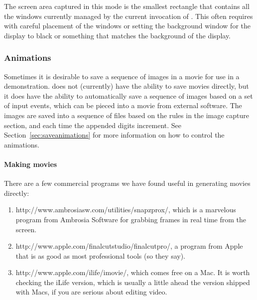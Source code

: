 The screen area captured in this mode is the smallest rectangle that
contains all the windows currently managed by the current invocation of
\map{}.  This often requires with careful placement of the windows or
setting the background window for the display to black or something that
matches the background of the \map{} display.


\subsubsection{Animations}
\label{sec:animation}

Sometimes it is desirable to save a sequence of images in a movie for use
in a demonstration.  \map{} does not (currently) have the ability to save
movies directly, but it does have the ability to automatically save a
sequence of images based on a set of input events, which can be pieced into
a movie from external software.  The images
are saved into a sequence of files based on the rules in the image capture
section, and each time the appended digits increment.  See
Section~\ref{sec:saveanimations} for more information on how to control the
animations.

\paragraph{Making movies}

There are a few commercial programs we have found useful in 
generating movies directly:
\begin{enumerate}
  \item {}
    {http://www.ambrosiasw.com/utilities/snapzprox/}, which is a marvelous
    program from Ambrosia Software for grabbing frames in real time from
    the screen.
  \item {}
    {http://www.apple.com/finalcutstudio/finalcutpro/}, a program from
    Apple that is as good as most professional tools (so they say).
  \item {} {http://www.apple.com/ilife/imovie/},
    which comes free on a Mac.  It is worth checking the iLife version,
    which is usually a little ahead the version shipped with Macs, if you
    are serious about editing video.
\end{enumerate}

